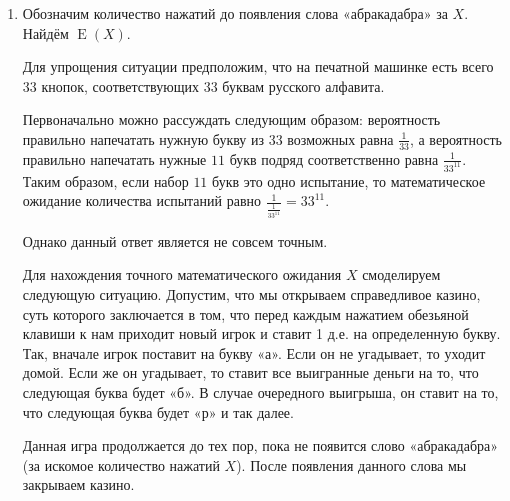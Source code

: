 \documentclass[nobib]{tufte-handout}
\theoremstyle{definition}
\newcounter{problem}
\newenvironment{problem}%
{%
\refstepcounter{problem}%
     \hypertarget{problem:{\theproblem}}{}
     \Writetofile{solution_file}{\protect\hypertarget{soln:\theproblem}{}}
     \begin{myenum}[label=\bfseries\protect\hyperlink{soln:\theproblem}{\theproblem},ref=\theproblem]
     \item%
    }%
    {%
    \end{myenum}}
\DeclareMathOperator{\E}{E}
\begin{document}
\begin{problem}
\begin{sol}
\begin{enumerate}
Подобная формула применяется для любой другой строки символов конечной длины.
При этом если заменить слово «обезьяна» на текст «Гамлета»,
показатель степени увеличится с $8$ до числа символов в этом тексте,
но суть от этого не изменится. Таким образом, если устремить $n$ к бесконечности,
выражение $\left(1 - \frac{1}{50^6}\right)^n$ будет стремиться к нулю.
Иными словами, при бесконечном количестве обезьян вероятность
не напечатать текст любой сложности будет близка к нулю.
Однако условие наличия бесконечного количества обезьян равносильно
условию наличия одной обезьяны, печатающей при неограниченном количестве времени.

В результате получаем, что вероятность того, что одна обезьяна рано или поздно
не напечатает полное собрание сочинений Шекспира стремится к нулю,
значит вероятность того, что она его напечает, стремится к единице.

\item Обозначим количество нажатий до появления слова «абракадабра» за $X$.
Найдём $\E(X)$.


Для упрощения ситуации предположим, что на печатной машинке есть всего $33$ кнопок,
соответствующих $33$ буквам русского алфавита.

Первоначально можно рассуждать следующим образом:
вероятность правильно напечатать нужную букву из $33$ возможных равна $\frac{1}{33}$,
а вероятность правильно напечатать нужные $11$ букв подряд соответственно
равна $\frac{1}{33^{11}}$. Таким образом, если набор $11$ букв это одно испытание,
то математическое ожидание количества испытаний
равно $\frac{1}{\frac{1}{33^{11}}} = 33^{11}$.

Однако данный ответ является не совсем точным.

Для нахождения точного математического ожидания $X$ смоделируем следующую ситуацию.
Допустим, что мы открываем справедливое казино, суть которого заключается в том,
что перед каждым нажатием обезьяной клавиши к нам приходит новый игрок и
ставит 1 д.е. на определенную букву. Так, вначале игрок поставит на букву «а».
Если он не угадывает, то уходит домой. Если же он угадывает,
то ставит все выигранные деньги на то, что следующая буква будет «б».
В случае очередного выигрыша, он ставит на то, что следующая буква будет «р»
и так далее.

Данная игра продолжается до тех пор, пока не появится слово «абракадабра»
(за искомое количество нажатий $X$). После появления данного слова мы закрываем казино.


\end{enumerate}
\end{sol}
\end{problem}
\end{document}
